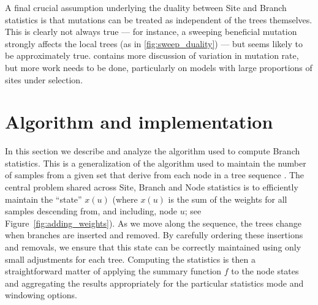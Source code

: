 \documentclass[9pt,twoside,lineno]{gsajnl}
\begin{document}

A final crucial assumption underlying the duality between Site and Branch
statistics is that mutations can be treated as independent of the trees themselves.
This is clearly not always true --- for instance,
a sweeping beneficial mutation strongly affects the local trees (as in \autoref{fig:sweep_duality}) ---
but seems likely to be approximately true.
\citet{ralph2019empirical} contains more discussion of variation in mutation rate,
but more work needs to be done, particularly on models with large proportions of sites under selection.


\section*{Algorithm and implementation}

In this section we describe and analyze the algorithm used
to compute Branch statistics. This is a generalization
of the algorithm used to maintain the number of samples from a
given set that derive from each node in a tree
sequence \cite[Algorithm L]{kelleher2016efficient}. The central
problem shared across Site, Branch and Node statistics
is to efficiently maintain the ``state'' $x(u)$ (where $x(u)$ is the
sum of the weights for all samples descending
from, and including, node $u$; see Figure~\ref{fig:adding_weights}).
As we move along the sequence, the trees change when branches are inserted and removed.
By carefully ordering these insertions and removals,
we ensure that this state can be correctly maintained
using only small adjustments for each tree.
Computing the statistics is then a straightforward matter of applying the summary function $f$
to the node states and aggregating the results appropriately for the
particular statistics mode and windowing options.
\end{document}
